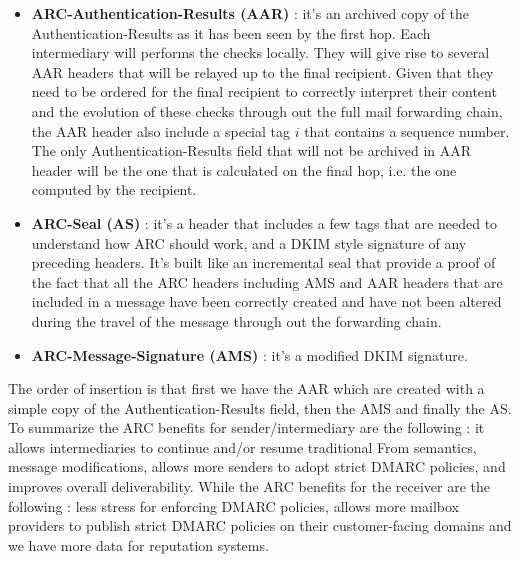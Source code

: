 \begin{itemize}
\item \textbf{ARC-Authentication-Results (AAR)} : it's an archived copy of the Authentication-Results as it has been seen by the first hop. Each intermediary will performs the checks locally. They will give rise to several AAR headers that will be relayed up to the final recipient. Given that they need to be ordered for the final recipient to correctly interpret their content and the evolution of these checks through out the full mail forwarding chain, the AAR header also include a special tag $i$ that contains a sequence number. The only Authentication-Results field that will not be archived in AAR header will be the one that is calculated on the final hop, i.e. the one computed by the recipient.
\item \textbf{ARC-Seal (AS)} : it's a header that includes a few tags that are needed to understand how ARC should work, and a DKIM style signature of any preceding headers. It's built like an incremental seal that provide a proof of the fact that all the ARC headers including AMS and AAR headers that are included in a message have been correctly created and have not been altered during the travel of the message through out the forwarding chain.
\item \textbf{ARC-Message-Signature (AMS)} : it's a modified DKIM signature.
\end{itemize}
The order of insertion is that first we have the AAR which are created with a simple copy of the Authentication-Results field, then the AMS and finally the AS. To summarize the ARC benefits for sender/intermediary are the following : it allows intermediaries to continue and/or resume traditional From semantics, message modifications, allows more senders to adopt strict DMARC policies, and improves overall deliverability. While the ARC benefits for the receiver are the following : less stress for enforcing DMARC policies, allows more mailbox providers to publish strict DMARC policies on their customer-facing domains and we have more data for reputation systems.

